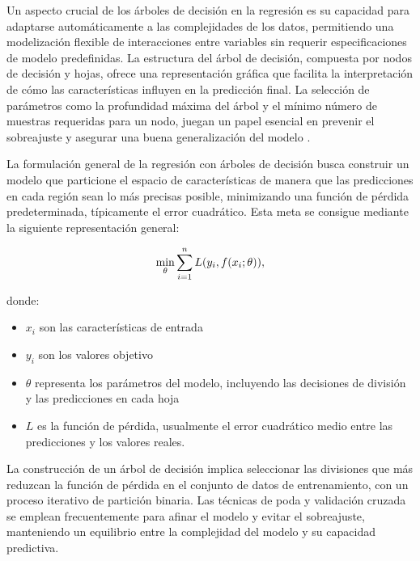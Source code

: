 \documentclass[
  11pt,
  bookmarksnumbered]{article}
\providecommand{\tightlist}{%
  \setlength{\itemsep}{0pt}\setlength{\parskip}{0pt}}
\begin{document}
Un aspecto crucial de los árboles de decisión en la regresión es su capacidad para adaptarse automáticamente a las complejidades de los datos, permitiendo una modelización flexible de interacciones entre variables sin requerir especificaciones de modelo predefinidas.
La estructura del árbol de decisión, compuesta por nodos de decisión y hojas, ofrece una representación gráfica que facilita la interpretación de cómo las características influyen en la predicción final.
La selección de parámetros como la profundidad máxima del árbol y el mínimo número de muestras requeridas para un nodo, juegan un papel esencial en prevenir el sobreajuste y asegurar una buena generalización del modelo \textcite{Quinlan1993}.

La formulación general de la regresión con árboles de decisión busca construir un modelo que particione el espacio de características de manera que las predicciones en cada región sean lo más precisas posible, minimizando una función de pérdida predeterminada, típicamente el error cuadrático.
Esta meta se consigue mediante la siguiente representación general:


\begin{equation}
\large \min_{\theta} \sum_{i=1}^{n} L(y_i, f(x_i;\theta)),
\end{equation}

donde:

\begin{itemize}
\tightlist
\item
  \(x_i\) son las características de entrada
\item
  \(y_i\) son los valores objetivo
\item
  \(\theta\) representa los parámetros del modelo, incluyendo las decisiones de división y las predicciones en cada hoja
\item
  \(L\) es la función de pérdida, usualmente el error cuadrático medio entre las predicciones y los valores reales.
\end{itemize}

La construcción de un árbol de decisión implica seleccionar las divisiones que más reduzcan la función de pérdida en el conjunto de datos de entrenamiento, con un proceso iterativo de partición binaria.
Las técnicas de poda y validación cruzada se emplean frecuentemente para afinar el modelo y evitar el sobreajuste, manteniendo un equilibrio entre la complejidad del modelo y su capacidad predictiva.
\end{document}
